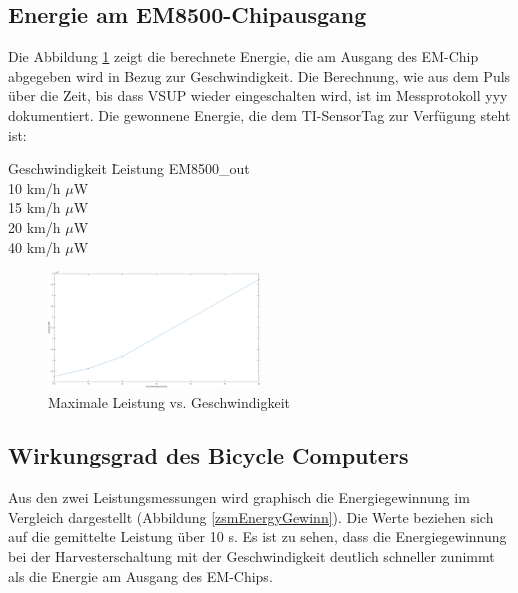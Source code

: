 \subsection{Energie am EM8500-Chipausgang}

Die Abbildung \ref{energie_resultat_harvester} zeigt die berechnete Energie, die am Ausgang des EM-Chip abgegeben wird in Bezug zur Geschwindigkeit. Die Berechnung, wie aus dem Puls über die Zeit, bis dass VSUP wieder eingeschalten wird, ist im  Messprotokoll yyy dokumentiert. Die gewonnene Energie, die dem TI-SensorTag zur Verfügung steht ist:


\begin{minipage}{\textwidth}
    \label{res_em_aus}
    \begin{tabbing}
        Geschwindigkeit \quad\= Leistung EM8500\_out \\[0.8ex]
        10 km/h     $\mu$W\\
        15 km/h    $\mu$W\\
        20 km/h    $\mu$W\\
        40 km/h   $\mu$W\\
    \end{tabbing}
\end{minipage}


\begin{figure}[ht]
    \includegraphics[width=0.5\textwidth]{4Resultate/imag/ResultatLeistungGeschwindigkeit.png} 
    \caption{Maximale Leistung vs. Geschwindigkeit}
    \label{energie_resultat_harvester}
\end{figure}

\subsection{Wirkungsgrad des Bicycle Computers}

Aus den zwei Leistungsmessungen wird graphisch die Energiegewinnung im Vergleich dargestellt (Abbildung \ref{zsmEnergyGewinn}). Die Werte beziehen sich auf die gemittelte Leistung über 10 s. Es ist zu sehen, dass die Energiegewinnung bei der Harvesterschaltung mit der Geschwindigkeit deutlich schneller zunimmt als die Energie am Ausgang des EM-Chips. 

